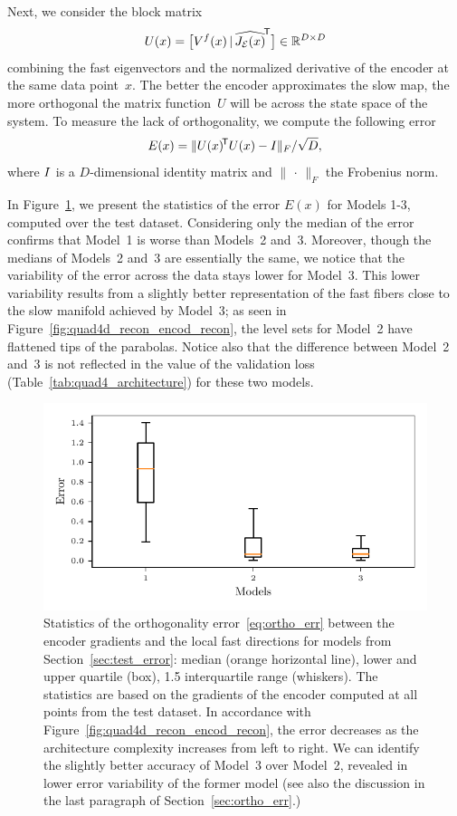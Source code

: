 \documentclass{article}
\newcommand{\enc}{\mathcal{E}} %
\newcommand{\jac}[1]{J_{#1}} %
\begin{document}
Next, we consider the block matrix
\begin{equation*}
    U(x) = \big[V^f(x)\,|\,\tp{\ohat{\jac{\enc}(x)}}\big]\in\mat{D}{D}
\end{equation*}
combining the fast eigenvectors and the normalized derivative of the encoder at the same data point~$x$. The better the encoder approximates the slow map, the more orthogonal the matrix function~$U$ will be across the state space of the system. To measure the lack of orthogonality, we compute the following error
\begin{equation}\label{eq:ortho_err}
    E(x) = \|U(x)^{\!\mathsf{T}}U(x) - {I}\|_{F} / \sqrt{D},
\end{equation}
where ${I}$ is a $D$-dimensional identity matrix and $\|\,\cdot\,\|_F$ the Frobenius norm.

In Figure~\ref{fig:quad4d_enc_err_derivatives}, we present the statistics of the error $E(x)$ for Models 1-3, computed over the test dataset. Considering only the median of the error confirms that Model~1 is worse than Models~2 and~3. Moreover, though the medians of Models~2 and~3 are essentially the same, we notice that the variability of the error across the data stays lower for Model~3. This lower variability results from a slightly better representation of the fast fibers close to the slow manifold achieved by Model~3; as seen in Figure~\ref{fig:quad4d_recon_encod_recon}, the level sets for Model~2 have flattened tips of the parabolas. Notice also that the difference between Model~2 and~3 is not reflected in the value of the validation loss (Table~\ref{tab:quad4_architecture}) for these two models.

\begin{figure}
    \centering
    \includegraphics[]{figs/quad4d_enc_err_derivatives.pdf}
    \caption{Statistics of the orthogonality error~\eqref{eq:ortho_err} between the encoder gradients and the local fast directions for models from Section~\ref{sec:test_error}: median (orange horizontal line), lower and upper quartile (box), 1.5 interquartile range (whiskers). The statistics are based on the gradients of the encoder computed at all points from the test dataset. In accordance with Figure~\ref{fig:quad4d_recon_encod_recon}, the error decreases as the architecture complexity increases from left to right. We can identify the slightly better accuracy of Model~3 over Model~2, revealed in lower error variability of the former model (see also the discussion in the last paragraph of Section~\ref{sec:ortho_err}.)
    }
    \label{fig:quad4d_enc_err_derivatives}
\end{figure}
\end{document}
